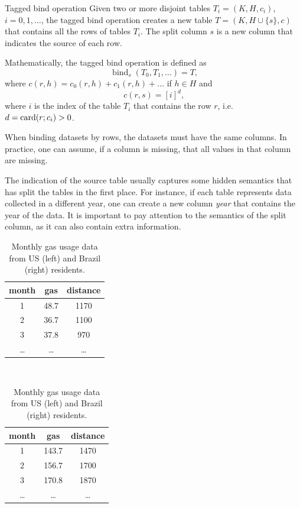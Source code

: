 \begin{definition}{Tagged bind operation}\label{def:tagged-bind}
  Given two or more disjoint tables $T_i = (K, H, c_i)$, $i = 0, 1, \dots$, the tagged
  bind operation creates a new table $T = (K, H \cup \{s\}, c)$ that contains all the rows
  of tables $T_i$.  The split column $s$ is a new column that indicates the source of each
  row.

  Mathematically, the tagged bind operation is defined as \[
    \operatorname{bind}_{s}(T_0, T_1, \dots) = T\text{,}
  \] where $c(r, h) = c_0(r, h) + c_1(r, h) + \dots$ if $h \in H$ and \[
    c(r, s) = \left[ i \right]^{d} \text{,}
  \]
  where $i$ is the index of the table $T_i$ that contains the row $r$, i.e. $d =
  \rowcard[r; c_i] > 0$.
\end{definition}

When binding datasets by rows, the datasets must have the same columns.  In practice,
one can assume, if a column is missing, that all values in that column are missing.

The indication of the source table usually captures some hidden semantics that has split
the tables in the first place. For instance, if each table represents data collected in a
different year, one can create a new column \emph{year} that contains the year of the
data.  It is important to pay attention to the semantics of the split column, as it can
also contain extra information.

\begin{table}
  \centering
  \begin{tabular}{ccc}
    \toprule
    \textbf{month} & \textbf{gas} & \textbf{distance} \\
    \midrule
    1 & 48.7 & 1170 \\
    2 & 36.7 & 1100 \\
    3 & 37.8 & 970 \\
    \dots & \dots & \dots \\
    \bottomrule
  \end{tabular}
  ~
  \begin{tabular}{ccc}
    \toprule
    \textbf{month} & \textbf{gas} & \textbf{distance} \\
    \midrule
    1 & 143.7 & 1470 \\
    2 & 156.7 & 1700 \\
    3 & 170.8 & 1870 \\
    \dots & \dots & \dots \\
    \bottomrule
  \end{tabular}
  \caption{
  Monthly gas usage data from US (left) and Brazil (right) residents.
  }
  \label{tab:gas-usage}
\end{table}


